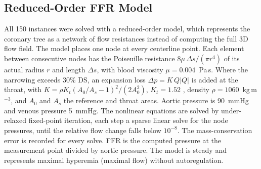 \documentclass[journal]{IEEEtran}
\begin{document}
\subsection{Reduced-Order FFR Model}
All 150 instances were solved with a reduced-order model, which represents the coronary tree as a network of flow
resistances instead of computing the full 3D flow field. The model places one node at every centerline point. Each element between consecutive nodes has the Poiseuille
resistance $8\mu\,\Delta s/(\pi r^4)$ of its actual radius $r$ and length $\Delta s$, with blood viscosity
$\mu = 0.004$~Pa\,s. Where the narrowing exceeds 30\% DS, an expansion loss $\Delta p = K\,Q|Q|$ is added at the
throat, with $K = \rho K_t (A_0/A_s - 1)^2 / (2A_0^2)$, $K_t = 1.52$ \cite{young1973}, density
$\rho = 1060$~kg\,m$^{-3}$, and $A_0$ and $A_s$ the reference and throat areas. Aortic pressure is 90~mmHg and
venous pressure 5~mmHg. The nonlinear equations are solved by under-relaxed fixed-point iteration, each step a sparse linear
solve for the node pressures, until the relative flow change falls below $10^{-8}$. The mass-conservation error is recorded for every solve. FFR is the computed
pressure at the measurement point divided by aortic pressure. The model is steady and represents maximal hyperemia
(maximal flow) without autoregulation.
\end{document}
